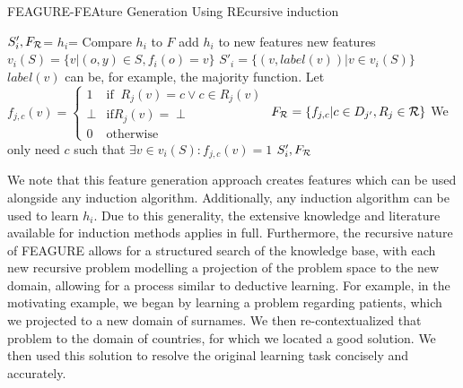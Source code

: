 \documentclass[twoside,11pt]{article}
\theoremstyle{definition}
\begin{document}
\begin{algorithm}[H]
	\caption{FEAGURE-FEAture Generation Using REcursive induction}
	\label{code-creating-prob}
	\small
		\begin{algorithmic}
				\State $S'_i,F_{\cal R}$=  
				\State $h_i$=  
				 \Comment Compare $h_i$ to $F$
				\State add $h_i$ to new features
				\EndIf
				\EndFor
				\State \Return new features
			\EndFunction
			\State 
                \State $v_i(S) = \{v | (o,y) \in S, f_{i}(o)=v\}$
                \State $S'_i = \{ (v, label(v)) | v \in v_i(S) \}$ 
                \Comment $label(v)$ can be, for example, the majority function.
                \State Let $f_{j,c}(v)=\begin{cases} 1 &\mbox{if } \ R_j(v)=c\lor c\in R_j(v) \\ 
                \perp & \mbox{if} R_j(v)=\perp\\
                0 & \mbox{otherwise } \end{cases}$
                \State $F_{\cal R}=\{f_{j,c}| c\in D_{j'}, R_j\in{\cal R}\}$
                \State \Comment We only need $c$ such that $\exists v\in v_i(S):f_{j,c}(v)=1$
                \State \Return $S'_i, F_{\cal R}$ 
			\EndFunction
			
		\end{algorithmic}
	\end{algorithm}

We note that this feature generation approach creates features which can be used alongside any induction algorithm. Additionally, any induction algorithm can be used to learn $h_i$. Due to this generality, the extensive knowledge and literature available for induction methods applies in full. Furthermore, the recursive nature of FEAGURE allows for a structured search of the knowledge base, with each new recursive problem modelling a projection of the problem space to the new domain, allowing for a process similar to deductive learning. For example, in the motivating example, we began by learning a problem regarding patients, which we projected to a new domain of surnames. We then re-contextualized that problem to the domain of countries, for which we located a good solution. We then used this solution to resolve the original learning task concisely and accurately.
\end{document}
